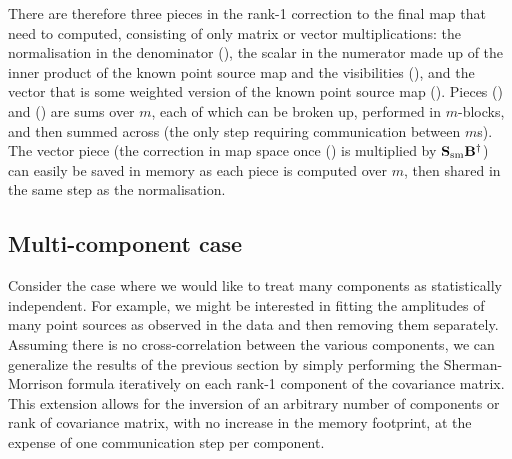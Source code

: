 There are therefore three pieces in the rank-1 correction to the final map that need to computed, consisting of only matrix or vector multiplications: the normalisation in the denominator (), the scalar in the numerator made up of the inner product of the known point source map and the visibilities (), and the vector that is some weighted version of the known point source map (). Pieces () and () are sums over $m$, each of which can be broken up, performed in $m$-blocks, and then summed across (the only step requiring communication between $m$s). The vector piece (the correction in map space once () is multiplied by $\mathbf{S}_{\rm sm}\mathbf{B}^{\dagger}$) can easily be saved in memory as each piece is computed over $m$, then shared in the same step as the normalisation.

\subsection{Multi-component case}
\label{ch:mm:sec:algorithm:ss:mc}

Consider the case where we would like to treat many components as statistically independent. For example, we might be interested in fitting the amplitudes of many point sources as observed in the data and then removing them separately. Assuming there is no cross-correlation between the various components, we can generalize the results of the previous section by simply performing the Sherman-Morrison formula iteratively on each rank-1 component of the covariance matrix. This extension allows for the inversion of an arbitrary number of components or rank of covariance matrix, with no increase in the memory footprint, at the expense of one communication step per component.

